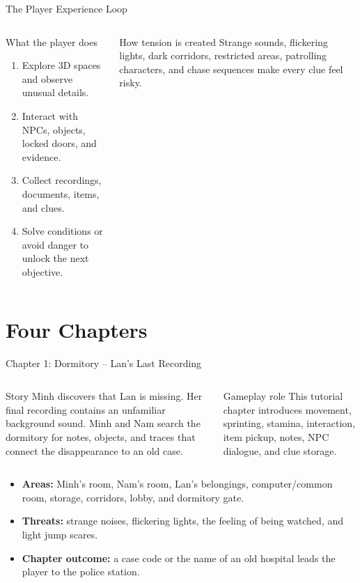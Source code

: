 \documentclass[aspectratio=169,10pt]{beamer}
\begin{document}
\begin{frame}{The Player Experience Loop}
  \begin{columns}[T,onlytextwidth]
    \begin{block}{What the player does}
      \begin{enumerate}
        \item Explore 3D spaces and observe unusual details.
        \item Interact with NPCs, objects, locked doors, and evidence.
        \item Collect recordings, documents, items, and clues.
        \item Solve conditions or avoid danger to unlock the next objective.
      \end{enumerate}
    \end{block}
    \begin{alertblock}{How tension is created}
      Strange sounds, flickering lights, dark corridors, restricted areas, patrolling characters, and chase sequences make every clue feel risky.
    \end{alertblock}
  \end{columns}
\end{frame}

\section{Four Chapters}
\begin{frame}{Chapter 1: Dormitory -- Lan's Last Recording}
  \begin{columns}[T,onlytextwidth]
    \begin{block}{Story}
      Minh discovers that Lan is missing. Her final recording contains an unfamiliar background sound. Minh and Nam search the dormitory for notes, objects, and traces that connect the disappearance to an old case.
    \end{block}
    \begin{block}{Gameplay role}
      This tutorial chapter introduces movement, sprinting, stamina, interaction, item pickup, notes, NPC dialogue, and clue storage.
    \end{block}
  \end{columns}

  \vspace{0.2cm}
  \begin{itemize}
    \item \textbf{Areas:} Minh's room, Nam's room, Lan's belongings, computer/common room, storage, corridors, lobby, and dormitory gate.
    \item \textbf{Threats:} strange noises, flickering lights, the feeling of being watched, and light jump scares.
    \item \textbf{Chapter outcome:} a case code or the name of an old hospital leads the player to the police station.
  \end{itemize}
\end{frame}
\end{document}
